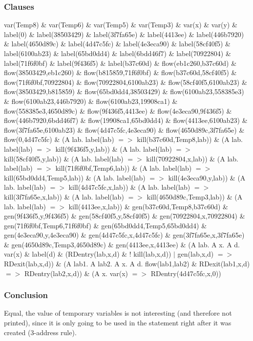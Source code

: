 \subsubsection{Clauses}
var(Temp8) \& var(Temp6) \& var(Temp5) \& var(Temp3) \& var(x) \& var(y) \& 
label(0) \& label(38503429) \& label(3f7fa65e) \& label(4413ee) \& label(446b7920) \& label(4650d89c) \& label(4d47c5fc) \& label(4e3eca90) \& label(58cf40f5) \& label(6100ab23) \& label(65bd0dd4) \& label(6bdd46f7) \& label(70922804) \& label(71f6f0bf) \& label(9f436f5) \& label(b37c60d) \& 
flow(eb1c260,b37c60d) \& flow(38503429,eb1c260) \& flow(b815859,71f6f0bf) \& flow(b37c60d,58cf40f5) \& flow(71f6f0bf,70922804) \& flow(70922804,6100ab23) \& flow(58cf40f5,6100ab23) \& flow(38503429,b815859) \& flow(65bd0dd4,38503429) \& flow(6100ab23,558385e3) \& flow(6100ab23,446b7920) \& flow(6100ab23,19908ca1) \& flow(558385e3,4650d89c) \& flow(9f436f5,4413ee) \& flow(4e3eca90,9f436f5) \& flow(446b7920,6bdd46f7) \& flow(19908ca1,65bd0dd4) \& flow(4413ee,6100ab23) \& flow(3f7fa65e,6100ab23) \& flow(4d47c5fc,4e3eca90) \& flow(4650d89c,3f7fa65e) \& flow(0,4d47c5fc) \& 
(A lab. label(lab) $=>$ kill(b37c60d,Temp8,lab)) \& (A lab. label(lab) $=>$ kill(9f436f5,y,lab)) \& (A lab. label(lab) $=>$ kill(58cf40f5,y,lab)) \& (A lab. label(lab) $=>$ kill(70922804,x,lab)) \& (A lab. label(lab) $=>$ kill(71f6f0bf,Temp6,lab)) \& (A lab. label(lab) $=>$ kill(65bd0dd4,Temp5,lab)) \& (A lab. label(lab) $=>$ kill(4e3eca90,y,lab)) \& (A lab. label(lab) $=>$ kill(4d47c5fc,x,lab)) \& (A lab. label(lab) $=>$ kill(3f7fa65e,x,lab)) \& (A lab. label(lab) $=>$ kill(4650d89c,Temp3,lab)) \& (A lab. label(lab) $=>$ kill(4413ee,x,lab)) \& 
gen(b37c60d,Temp8,b37c60d) \& gen(9f436f5,y,9f436f5) \& gen(58cf40f5,y,58cf40f5) \& gen(70922804,x,70922804) \& gen(71f6f0bf,Temp6,71f6f0bf) \& gen(65bd0dd4,Temp5,65bd0dd4) \& gen(4e3eca90,y,4e3eca90) \& gen(4d47c5fc,x,4d47c5fc) \& gen(3f7fa65e,x,3f7fa65e) \& gen(4650d89c,Temp3,4650d89c) \& gen(4413ee,x,4413ee) \& 
(A lab. A x. A d. var(x) \& label(d) \& (RDentry(lab,x,d) \& ! kill(lab,x,d)) $|$ gen(lab,x,d) $=>$ RDexit(lab,x,d)) \& 
(A lab1. A lab2. A x. A d. flow(lab1,lab2) \& RDexit(lab1,x,d) $=>$ RDentry(lab2,x,d)) \& 
(A x. var(x) $=>$ RDentry(4d47c5fc,x,0))
\subsubsection{Conclusion}
Equal, the value of temporary variables is not interesting (and therefore not printed), since it is only going to be used in the statement right after it was created (3-address rule).

